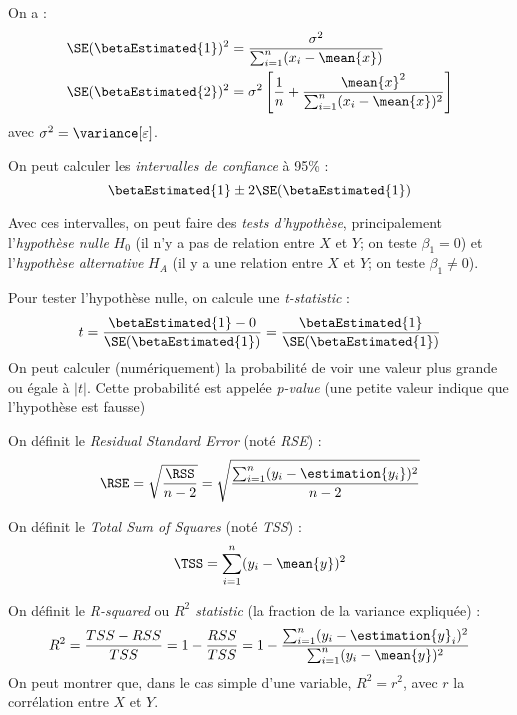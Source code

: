         On a :
        \begin{align*}
            \SE(\betaEstimated{1})^2 &= \frac{\sigma^2}{\sum_{i=1}^n (x_i - \mean{x})}\\
            \SE(\betaEstimated{2})^2 &= \sigma^2 \left[\frac{1}{n} + \frac{\mean{x}^2}{\sum_{i=1}^n (x_i - \mean{x})^2}\right]
        \end{align*}
        avec \(\sigma^2 = \variance[\varepsilon]\).

        On peut calculer les \textit{intervalles de confiance} à 95\% :
        \[
            \betaEstimated{1} \pm 2\SE(\betaEstimated{1})
        \]

        Avec ces intervalles, on peut faire des \textit{tests d'hypothèse}, principalement l'\textit{hypothèse nulle} \(H_0\) (il n'y a pas de relation entre \(X\) et \(Y\); on teste \(\beta_1 = 0\)) et l'\textit{hypothèse alternative} \(H_A\) (il y a une relation entre \(X\) et \(Y\); on teste \(\beta_1 \not= 0\)).

        Pour tester l'hypothèse nulle, on calcule une \textit{t-statistic} :
        \[
            t = \frac{\betaEstimated{1} - 0}{\SE(\betaEstimated{1})} = \frac{\betaEstimated{1}}{\SE(\betaEstimated{1})}
        \]
        On peut calculer (numériquement) la probabilité de voir une valeur plus grande ou égale à \(|t|\). Cette probabilité est appelée \textit{p-value} (une petite valeur indique que l'hypothèse est fausse)
        
        \begin{definition}
            On définit le \textit{Residual Standard Error} (noté \textit{RSE}) :
            \[
                \RSE = \sqrt{\frac{\RSS}{n-2}} = \sqrt{\frac{\sum_{i=1}^n (y_i - \estimation{y_i})^2}{n - 2}}
            \]

            On définit le \textit{Total Sum of Squares} (noté \textit{TSS}) :
            \[
                \TSS = \sum_{i=1}^n (y_i - \mean{y})^2
            \]

            On définit le \textit{R-squared} ou \textit{\(R^2\) statistic} (la fraction de la variance expliquée) :
            \[
                R^2 = \frac{TSS - RSS}{TSS} = 1 - \frac{RSS}{TSS} = 1 - \frac{\sum_{i=1}^n (y_i - \estimation{y}_i)^2}{\sum_{i=1}^n (y_i - \mean{y})^2}
            \]
            On peut montrer que, dans le cas simple d'une variable, \(R^2 = r^2\), avec \(r\) la corrélation entre \(X\) et \(Y\).
        \end{definition}

